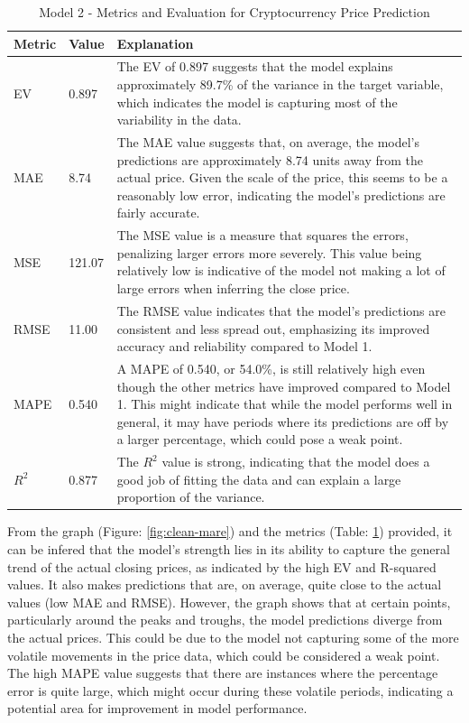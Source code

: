 \begin{table}[H]
\centering
\begin{tabular}{l l p{10cm}}
\textbf{Metric} & \textbf{Value} & \textbf{Explanation} \\
\hline
EV & 0.897 & The EV of 0.897 suggests that the model explains approximately 89.7\% of the variance in the target variable, which indicates the model is capturing most of the variability in the data. \\
MAE & 8.74 & The MAE value suggests that, on average, the model's predictions are approximately 8.74 units away from the actual price. Given the scale of the price, this seems to be a reasonably low error, indicating the model's predictions are fairly accurate. \\
MSE & 121.07 & The MSE value is a measure that squares the errors, penalizing larger errors more severely. This value being relatively low is indicative of the model not making a lot of large errors when inferring the close price. \\
RMSE & 11.00 & The RMSE value indicates that the model's predictions are consistent and less spread out, emphasizing its improved accuracy and reliability compared to Model 1. \\
MAPE & 0.540 &  A MAPE of 0.540, or 54.0\%, is still relatively high even though the other metrics have improved compared to Model 1. This might indicate that while the model performs well in general, it may have periods where its predictions are off by a larger percentage, which could pose a weak point. \\
\( R^2 \) & 0.877 & The \( R^2 \) value is strong, indicating that the model does a good job of fitting the data and can explain a large proportion of the variance. \\
\end{tabular}
\caption{Model 2 - Metrics and Evaluation for Cryptocurrency Price Prediction}
\label{table:new_model_evaluation}
\end{table}

From the graph (Figure: \ref{fig:clean-mare}) and the metrics (Table: \ref{table:new_model_evaluation}) provided, it can be infered that the model's strength lies in its ability to capture the general trend of the actual closing prices, as indicated by the high EV and R-squared values. It also makes predictions that are, on average, quite close to the actual values (low MAE and RMSE). However, the graph shows that at certain points, particularly around the peaks and troughs, the model predictions diverge from the actual prices. This could be due to the model not capturing some of the more volatile movements in the price data, which could be considered a weak point. The high MAPE value suggests that there are instances where the percentage error is quite large, which might occur during these volatile periods, indicating a potential area for improvement in model performance. 

